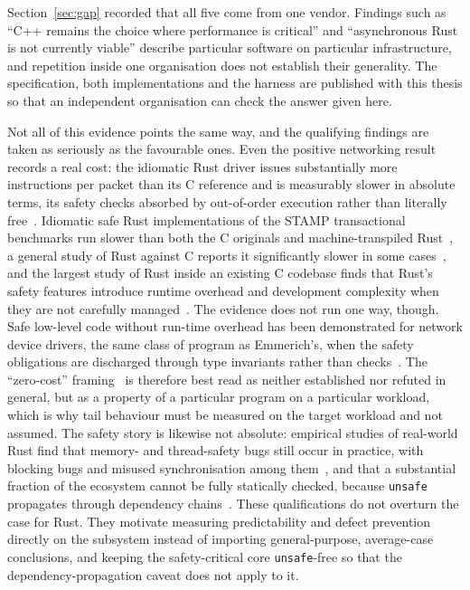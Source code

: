 Section~\ref{sec:gap} recorded that all five come from one vendor. Findings such as ``C++ remains
the choice where performance is critical'' and ``asynchronous Rust is not currently viable''
describe particular software on particular infrastructure, and repetition inside one organisation
does not establish their generality. The specification, both implementations and the harness are
published with this thesis so that an independent organisation can check the answer given here.

Not all of this evidence points the same way, and the qualifying findings are taken as seriously
as the favourable ones. Even the positive networking result records a real cost: the idiomatic
Rust driver issues substantially more instructions per packet than its C reference and is
measurably slower in absolute terms, its safety checks absorbed by out-of-order execution rather
than literally free~\cite{emmerich2019drivers}. Idiomatic safe Rust implementations of the STAMP
transactional benchmarks run slower than both the C originals and machine-transpiled
Rust~\cite{suchert2023stamp}, a general study of Rust against C reports it significantly slower in
some cases~\cite{okawa2024ruststudy}, and the largest study of Rust inside an existing C codebase
finds that Rust's safety features introduce runtime overhead and development complexity when they
are not carefully managed~\cite{li2026rustlinux}. The evidence does not run one way, though. Safe
low-level code without run-time overhead has been demonstrated for network device drivers, the
same class of program as Emmerich's, when the safety obligations are discharged through type
invariants rather than checks~\cite{pirelli2023safelowlevel}. The ``zero-cost''
framing~\cite{balasubramanian2017rust} is therefore best read as neither established nor refuted
in general, but as a property of a particular program on a particular workload, which is why tail
behaviour must be measured on the target workload and not assumed. The safety story is likewise
not absolute: empirical studies of real-world Rust find that memory- and thread-safety bugs still
occur in practice, with blocking bugs and misused synchronisation among
them~\cite{qin2020rust,qin2024safety}, and that a substantial fraction of the ecosystem cannot be
fully statically checked, because \texttt{unsafe} propagates through dependency
chains~\cite{evans2020rust}. These qualifications do not overturn the case for Rust. They motivate
measuring predictability and defect prevention directly on the subsystem instead of importing
general-purpose, average-case conclusions, and keeping the safety-critical core
\texttt{unsafe}-free so that the dependency-propagation caveat does not apply to it.

